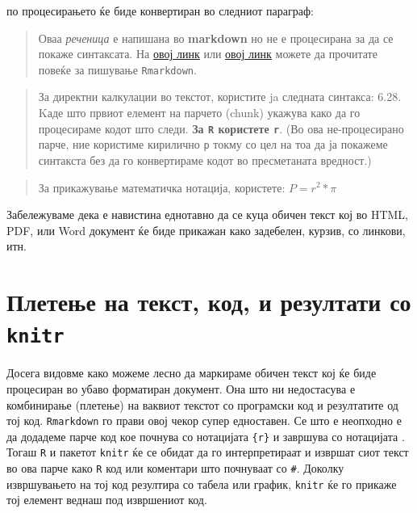 \documentclass[
]{book}
\begin{document}
по процесирањето ќе биде конвертиран во следниот параграф:

\begin{quote}
Оваа \emph{реченица} е напишана во \textbf{markdown} но не е процесирана за да се покаже синтаксата.
На \href{https://kbroman.org/knitr_knutshell/pages/Rmarkdown.html}{овој линк} или
\href{https://rmarkdown.rstudio.com/authoring_quick_tour.html}{овој линк} можете да
прочитате повеќе за пишување \texttt{Rmarkdown}.
\end{quote}

\begin{quote}
За директни калкулации во текстот, користите ja следната синтакса: 6.28.
Kаде што првиот елемент на парчето (chunk) укажува како да го процесираме кодот што следи.
\textbf{За \texttt{R} користете \texttt{r}}. (Во ова не-процесирано парче, ние користиме кирилично \texttt{р} токму со
цел на тоа да ја покажеме синтакста без да го конвертираме кодот во пресметаната вредност.)
\end{quote}

\begin{quote}
За прикажување математичка нотација, користете: \(P = r^2 * \pi\)
\end{quote}

Забележуваме дека е навистина еднотавно да се куца обичен текст кој во HTML, PDF, или Word документ ќе биде прикажан како задебелен, курзив, со линкови, итн.

\hypertarget{ux43fux43bux435ux442ux435ux45aux435-ux43dux430-ux442ux435ux43aux441ux442-ux43aux43eux434-ux438-ux440ux435ux437ux443ux43bux442ux430ux442ux438-ux441ux43e-knitr}{%
\section{\texorpdfstring{Плетење на текст, код, и резултати со \texttt{knitr}}{Плетење на текст, код, и резултати со knitr}}\label{ux43fux43bux435ux442ux435ux45aux435-ux43dux430-ux442ux435ux43aux441ux442-ux43aux43eux434-ux438-ux440ux435ux437ux443ux43bux442ux430ux442ux438-ux441ux43e-knitr}}

Досега видовме како можеме лесно да маркираме обичен текст кој ќе биде процесиран во убаво форматиран документ. Она што ни недостасува е комбинирање (плетење) на ваквиот текстот со програмски код и резултатите од тој код. \texttt{Rmarkdown} го прави овој чекор супер едноставен. Се што е неопходно е да додадеме парче код кое почнува со нотацијата \texttt{\textasciigrave{}\textasciigrave{}\textasciigrave{}\{r\}} и завршува со нотацијата \texttt{\textasciigrave{}\textasciigrave{}\textasciigrave{}}. Тогаш \texttt{R} и пакетот \texttt{knitr} ќе се обидат да го интерпретираат и извршат сиот текст во ова парче како \texttt{R} код или коментари што почнуваат со \texttt{\#}. Доколку извршувањето на тој код резултира со табела или график, \texttt{knitr} ќе го прикаже тој елемент веднаш под извршениот код.
\end{document}
